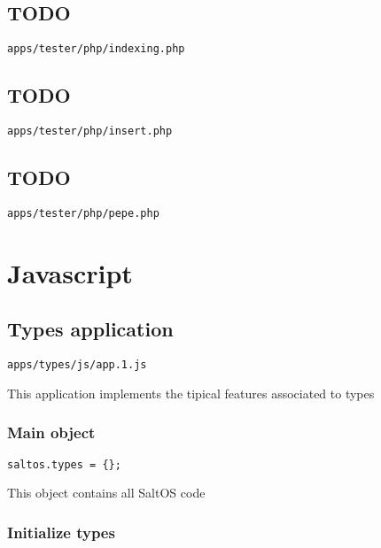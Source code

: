 \documentclass[a4paper]{article}
\begin{document}
\hypertarget{toc103}{}
\subsection{TODO}

\begin{lstlisting}
apps/tester/php/indexing.php
\end{lstlisting}

\hypertarget{toc104}{}
\subsection{TODO}

\begin{lstlisting}
apps/tester/php/insert.php
\end{lstlisting}

\hypertarget{toc105}{}
\subsection{TODO}

\begin{lstlisting}
apps/tester/php/pepe.php
\end{lstlisting}


\hypertarget{toc106}{}
\section{Javascript}

\hypertarget{toc107}{}
\subsection{Types application}

\begin{lstlisting}
apps/types/js/app.1.js
\end{lstlisting}

This application implements the tipical features associated to types

\hypertarget{toc108}{}
\subsubsection{Main object}

\begin{lstlisting}
saltos.types = {};
\end{lstlisting}

This object contains all SaltOS code

\hypertarget{toc109}{}
\subsubsection{Initialize types}
\end{document}
